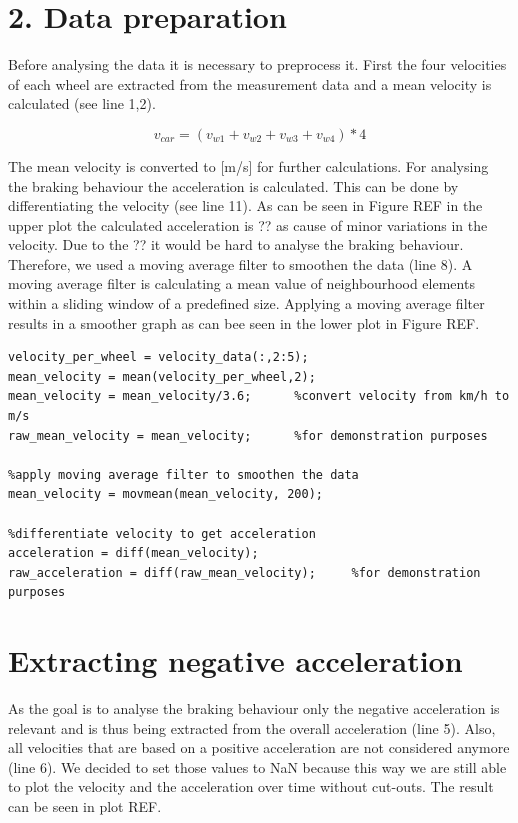 \section{2. Data preparation}
Before analysing the data it is necessary to preprocess it. First the four velocities of each wheel are extracted from the measurement data and a mean velocity is calculated (see line 1,2). 

\begin{equation}
	v_{car} = (v_{w1} +v_{w2} + v_{w3} +v_{w4})*4
\end{equation}


The mean velocity is converted to [m/s] for further calculations. For analysing the braking behaviour the acceleration is calculated. This can be done by differentiating the velocity (see line 11). As can be seen in Figure REF in the upper plot the calculated acceleration is ?? as cause of minor variations in the velocity. Due to the ?? it would be hard to analyse the braking behaviour. Therefore, we used a moving average filter to smoothen the data (line 8). A moving average filter is calculating a mean value of neighbourhood elements within a sliding window of a predefined size. Applying a moving average filter results in a smoother graph as can bee seen in the lower plot in Figure REF.

\begin{lstlisting}[basicstyle=\scriptsize	,caption= Preprocessing measurement data,label= lst:D3Preprocess]
%compute mean velocity of all 4 wheels
velocity_per_wheel = velocity_data(:,2:5);
mean_velocity = mean(velocity_per_wheel,2);
mean_velocity = mean_velocity/3.6;      %convert velocity from km/h to m/s
raw_mean_velocity = mean_velocity;      %for demonstration purposes

%apply moving average filter to smoothen the data
mean_velocity = movmean(mean_velocity, 200); 

%differentiate velocity to get acceleration
acceleration = diff(mean_velocity);
raw_acceleration = diff(raw_mean_velocity);     %for demonstration purposes
\end{lstlisting}

\section{Extracting negative acceleration}
As the goal is to analyse the braking behaviour only the negative acceleration is relevant and is thus being extracted from the overall acceleration (line 5). Also, all velocities that are based on a positive acceleration are not considered anymore (line 6). We decided to set those values to \ac{NaN} because this way we are still able to plot the velocity and the acceleration over time without cut-outs. The result can be seen in plot REF.

